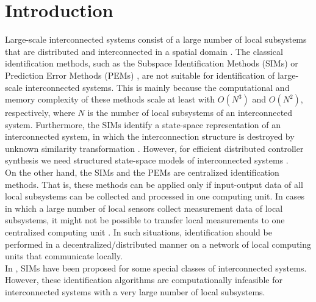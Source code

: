 \documentclass[journal,10pt]{IEEEtran}
\begin{document}
\section{Introduction}
Large-scale interconnected systems consist of a large number of local subsystems that are distributed and interconnected in a spatial domain \cite{benner2004,siljak1991,bamieh02distributedcontrol,dandrea2003}. The classical identification methods, such as the Subspace Identification Methods (SIMs) \cite{verhaegen2007} or Prediction Error Methods (PEMs) \cite{lennart1999system}, are not suitable for identification of large-scale interconnected systems. This is mainly because the computational and memory complexity of these methods scale at least with $O(N^{3})$ and $O(N^{2})$, respectively, where $N$ is the number of local subsystems of an interconnected system. Furthermore, the SIMs identify a state-space representation of an interconnected system, in which the interconnection structure is destroyed by unknown similarity transformation \cite{verhaegen2007}. However, for efficient distributed controller synthesis we need structured state-space models of interconnected systems \cite{paolo2009paper,bamieh02distributedcontrol,dandrea2003,justin2010distributed}.
\\
 On the other hand, the SIMs and the PEMs are centralized identification methods.
That is, these methods can be applied only if input-output data of all local subsystems can be collected and processed in one computing unit. In cases in which a large number of local sensors collect measurement data of local subsystems, it might not be possible to transfer local measurements to one centralized computing unit \cite{Rabbat2004}. In such situations, identification should be performed in a decentralized/distributed manner on a network of local computing units that communicate locally.  
\\
In \cite{paolo2009ident,massioniCirculant}, SIMs have been proposed for some special classes of interconnected systems. However, these identification algorithms are computationally infeasible for interconnected systems with a very large number of local subsystems.
\par
\end{document}
